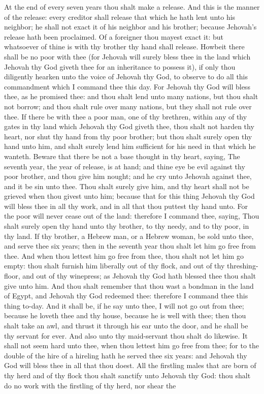 At the end of every seven years thou shalt make a release. And this is the manner of the release: every creditor shall release that which he hath lent unto his neighbor; he shall not exact it of his neighbor and his brother; because Jehovah’s release hath been proclaimed. Of a foreigner thou mayest exact it: but whatsoever of thine is with thy brother thy hand shall release. Howbeit there shall be no poor with thee (for Jehovah will surely bless thee in the land which Jehovah thy God giveth thee for an inheritance to possess it), if only thou diligently hearken unto the voice of Jehovah thy God, to observe to do all this commandment which I command thee this day. For Jehovah thy God will bless thee, as he promised thee: and thou shalt lend unto many nations, but thou shalt not borrow; and thou shalt rule over many nations, but they shall not rule over thee.  If there be with thee a poor man, one of thy brethren, within any of thy gates in thy land which Jehovah thy God giveth thee, thou shalt not harden thy heart, nor shut thy hand from thy poor brother; but thou shalt surely open thy hand unto him, and shalt surely lend him sufficient for his need in that which he wanteth. Beware that there be not a base thought in thy heart, saying, The seventh year, the year of release, is at hand; and thine eye be evil against thy poor brother, and thou give him nought; and he cry unto Jehovah against thee, and it be sin unto thee. Thou shalt surely give him, and thy heart shall not be grieved when thou givest unto him; because that for this thing Jehovah thy God will bless thee in all thy work, and in all that thou puttest thy hand unto. For the poor will never cease out of the land: therefore I command thee, saying, Thou shalt surely open thy hand unto thy brother, to thy needy, and to thy poor, in thy land.  If thy brother, a Hebrew man, or a Hebrew woman, be sold unto thee, and serve thee six years; then in the seventh year thou shalt let him go free from thee. And when thou lettest him go free from thee, thou shalt not let him go empty: thou shalt furnish him liberally out of thy flock, and out of thy threshing-floor, and out of thy winepress; as Jehovah thy God hath blessed thee thou shalt give unto him. And thou shalt remember that thou wast a bondman in the land of Egypt, and Jehovah thy God redeemed thee: therefore I command thee this thing to-day. And it shall be, if he say unto thee, I will not go out from thee; because he loveth thee and thy house, because he is well with thee; then thou shalt take an awl, and thrust it through his ear unto the door, and he shall be thy servant for ever. And also unto thy maid-servant thou shalt do likewise. It shall not seem hard unto thee, when thou lettest him go free from thee; for to the double of the hire of a hireling hath he served thee six years: and Jehovah thy God will bless thee in all that thou doest.  All the firstling males that are born of thy herd and of thy flock thou shalt sanctify unto Jehovah thy God: thou shalt do no work with the firstling of thy herd, nor shear the 